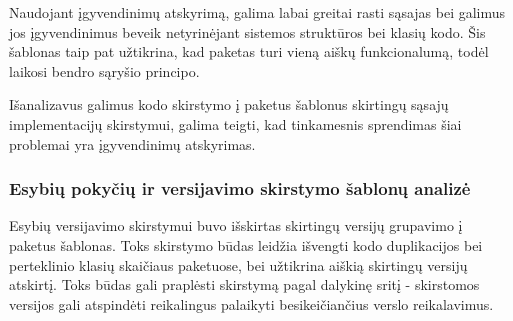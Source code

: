 Naudojant įgyvendinimų atskyrimą, galima labai greitai rasti sąsajas bei galimus jos įgyvendinimus beveik netyrinėjant sistemos struktūros bei klasių kodo.
Šis šablonas taip pat užtikrina, kad paketas turi vieną aiškų funkcionalumą, todėl laikosi bendro sąryšio principo.

Išanalizavus galimus kodo skirstymo į paketus šablonus skirtingų sąsajų implementacijų skirstymui, galima teigti, kad tinkamesnis sprendimas šiai
problemai yra įgyvendinimų atskyrimas.

\subsubsection{Esybių pokyčių ir versijavimo skirstymo šablonų analizė}
Esybių versijavimo skirstymui buvo išskirtas skirtingų versijų grupavimo į paketus šablonas.
Toks skirstymo būdas leidžia išvengti kodo duplikacijos bei perteklinio klasių skaičiaus paketuose, bei užtikrina aiškią skirtingų versijų
atskirtį. Toks būdas gali praplėsti skirstymą pagal dalykinę sritį - skirstomos versijos gali atspindėti reikalingus
palaikyti besikeičiančius verslo reikalavimus.
